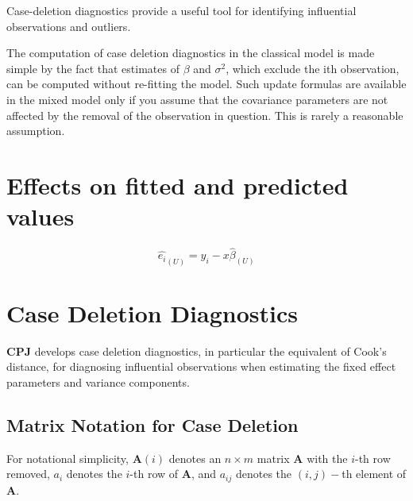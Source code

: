 \documentclass[MAIN.tex]{subfiles}
\begin{document}
	Case-deletion diagnostics provide a useful tool for identifying influential observations and outliers.
	
	The computation of case deletion diagnostics in the classical model is made simple by the fact that estimates of $\beta$ and $\sigma^2$, which exclude the ith observation, can be computed without re-fitting the model. Such update formulas are available in the mixed model only if you assume that the covariance parameters are not affected by the removal of the observation in question. This is rarely a reasonable assumption.
	
	\section{Effects on fitted and predicted values}
	\begin{equation}
	\hat{e_{i}}_{(U)} = y_{i} - x\hat{\beta}_{(U)}
	\end{equation}
	


	\section{Case Deletion Diagnostics} %
	
	\textbf{CPJ} develops  case deletion diagnostics, in particular the equivalent of  Cook's distance, for diagnosing influential observations when estimating the fixed effect parameters and variance components.
	
	\subsection{Matrix Notation for Case Deletion} %
	
	
	For notational simplicity, $\boldsymbol{A}(i)$ denotes an $n \times m$ matrix $\boldsymbol{A}$ with the $i$-th row
	removed, $a_i$ denotes the $i$-th row of $\boldsymbol{A}$, and $a_{ij}$ denotes the $(i, j)-$th element of $\boldsymbol{A}$.
	
\end{document}
